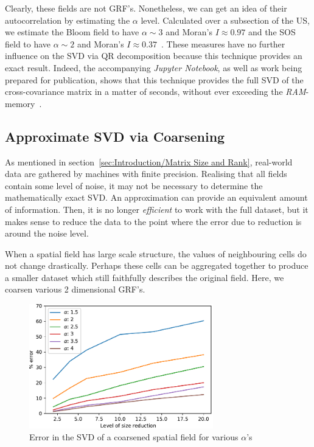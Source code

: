 \documentclass[ijgi,article,submit,moreauthors,pdftex,10pt,a4paper]{Definitions/mdpi}
\begin{document}
Clearly, these fields are not GRF's. Nonetheless, we can get an idea of their autocorrelation by estimating the $\alpha$ level. Calculated over a subsection of the US, we estimate the Bloom field to have $\alpha \sim 3$ and Moran's $I \approx 0.97$ and the SOS field to have $\alpha \sim 2$ and Moran's $I \approx 0.37$~\cite{Bogaardt2018}. These measures have no further influence on the SVD via QR decomposition because this technique provides an exact result. Indeed, the accompanying \textit{Jupyter Notebook}, as well as work being prepared for publication, shows that this technique provides the full SVD of the cross-covariance matrix in a matter of seconds, without ever exceeding the \textit{RAM}-memory~\cite{newRefToPhenologyArticle}.

\subsection{Approximate SVD via Coarsening}
\label{sec:Results/Approximate SVD via Coarsening}

As mentioned in section~\ref{sec:Introduction/Matrix Size and Rank}, real-world data are gathered by machines with finite precision. Realising that all fields contain some level of noise, it may not be necessary to determine the mathematically exact SVD. An approximation can provide an equivalent amount of information. Then, it is no longer \textit{efficient} to work with the full dataset, but it makes sense to reduce the data to the point where the error due to reduction is around the noise level.

When a spatial field has large scale structure, the values of neighbouring cells do not change drastically. Perhaps these cells can be aggregated together to produce a smaller dataset which still faithfully describes the original field. Here, we coarsen various 2 dimensional GRF's.

\begin{figure}[H]
\centering
\includegraphics[width=80mm]{Results/plotSingleSpatialFieldViaCoarsening.pdf}
\caption[Error after coarsening]{Error in the SVD of a coarsened spatial field for various $\alpha$'s}
\label{fig:plotSingleSpatialFieldViaCoarsening}
\end{figure}
\end{document}
